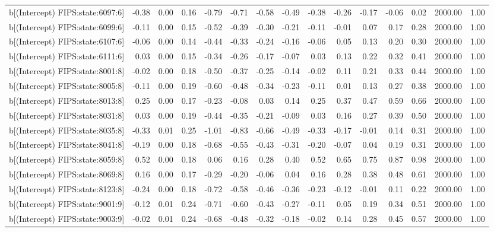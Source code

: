 \begin{table}[ht]
\begin{tabular}{rrrrrrrrrrrrrrr}
  b[(Intercept) FIPS:state:6097:6] & -0.38 & 0.00 & 0.16 & -0.79 & -0.71 & -0.58 & -0.49 & -0.38 & -0.26 & -0.17 & -0.06 & 0.02 & 2000.00 & 1.00 \\ 
  b[(Intercept) FIPS:state:6099:6] & -0.11 & 0.00 & 0.15 & -0.52 & -0.39 & -0.30 & -0.21 & -0.11 & -0.01 & 0.07 & 0.17 & 0.28 & 2000.00 & 1.00 \\ 
  b[(Intercept) FIPS:state:6107:6] & -0.06 & 0.00 & 0.14 & -0.44 & -0.33 & -0.24 & -0.16 & -0.06 & 0.05 & 0.13 & 0.20 & 0.30 & 2000.00 & 1.00 \\ 
  b[(Intercept) FIPS:state:6111:6] & 0.03 & 0.00 & 0.15 & -0.34 & -0.26 & -0.17 & -0.07 & 0.03 & 0.13 & 0.22 & 0.32 & 0.41 & 2000.00 & 1.00 \\ 
  b[(Intercept) FIPS:state:8001:8] & -0.02 & 0.00 & 0.18 & -0.50 & -0.37 & -0.25 & -0.14 & -0.02 & 0.11 & 0.21 & 0.33 & 0.44 & 2000.00 & 1.00 \\ 
  b[(Intercept) FIPS:state:8005:8] & -0.11 & 0.00 & 0.19 & -0.60 & -0.48 & -0.34 & -0.23 & -0.11 & 0.01 & 0.13 & 0.27 & 0.38 & 2000.00 & 1.00 \\ 
  b[(Intercept) FIPS:state:8013:8] & 0.25 & 0.00 & 0.17 & -0.23 & -0.08 & 0.03 & 0.14 & 0.25 & 0.37 & 0.47 & 0.59 & 0.66 & 2000.00 & 1.00 \\ 
  b[(Intercept) FIPS:state:8031:8] & 0.03 & 0.00 & 0.19 & -0.44 & -0.35 & -0.21 & -0.09 & 0.03 & 0.16 & 0.27 & 0.39 & 0.50 & 2000.00 & 1.00 \\ 
  b[(Intercept) FIPS:state:8035:8] & -0.33 & 0.01 & 0.25 & -1.01 & -0.83 & -0.66 & -0.49 & -0.33 & -0.17 & -0.01 & 0.14 & 0.31 & 2000.00 & 1.00 \\ 
  b[(Intercept) FIPS:state:8041:8] & -0.19 & 0.00 & 0.18 & -0.68 & -0.55 & -0.43 & -0.31 & -0.20 & -0.07 & 0.04 & 0.19 & 0.31 & 2000.00 & 1.00 \\ 
  b[(Intercept) FIPS:state:8059:8] & 0.52 & 0.00 & 0.18 & 0.06 & 0.16 & 0.28 & 0.40 & 0.52 & 0.65 & 0.75 & 0.87 & 0.98 & 2000.00 & 1.00 \\ 
  b[(Intercept) FIPS:state:8069:8] & 0.16 & 0.00 & 0.17 & -0.29 & -0.20 & -0.06 & 0.04 & 0.16 & 0.28 & 0.38 & 0.48 & 0.61 & 2000.00 & 1.00 \\ 
  b[(Intercept) FIPS:state:8123:8] & -0.24 & 0.00 & 0.18 & -0.72 & -0.58 & -0.46 & -0.36 & -0.23 & -0.12 & -0.01 & 0.11 & 0.22 & 2000.00 & 1.00 \\ 
  b[(Intercept) FIPS:state:9001:9] & -0.12 & 0.01 & 0.24 & -0.71 & -0.60 & -0.43 & -0.27 & -0.11 & 0.05 & 0.19 & 0.34 & 0.51 & 2000.00 & 1.00 \\ 
  b[(Intercept) FIPS:state:9003:9] & -0.02 & 0.01 & 0.24 & -0.68 & -0.48 & -0.32 & -0.18 & -0.02 & 0.14 & 0.28 & 0.45 & 0.57 & 2000.00 & 1.00 \\ 

\end{tabular}
\end{table}
